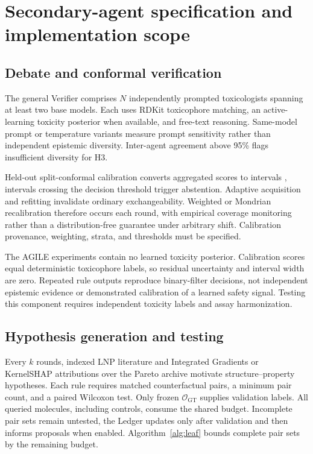 \section{Secondary-agent specification and implementation scope}
\label{app:agents}
\subsection{Debate and conformal verification}
The general Verifier comprises $N$ independently prompted toxicologists spanning at least two base models. Each uses RDKit toxicophore matching, an active-learning toxicity posterior when available, and free-text reasoning. Same-model prompt or temperature variants measure prompt sensitivity rather than independent epistemic diversity. Inter-agent agreement above 95\% flags insufficient diversity for H3.

Held-out split-conformal calibration converts aggregated scores to intervals \citep{angelopoulos2023}, intervals crossing the decision threshold trigger abstention. Adaptive acquisition and refitting invalidate ordinary exchangeability. Weighted or Mondrian recalibration therefore occurs each round, with empirical coverage monitoring rather than a distribution-free guarantee under arbitrary shift. Calibration provenance, weighting, strata, and thresholds must be specified.

The AGILE experiments contain no learned toxicity posterior. Calibration scores equal deterministic toxicophore labels, so residual uncertainty and interval width are zero. Repeated rule outputs reproduce binary-filter decisions, not independent epistemic evidence or demonstrated calibration of a learned safety signal. Testing this component requires independent toxicity labels and assay harmonization.

\subsection{Hypothesis generation and testing}
Every $k$ rounds, indexed LNP literature and Integrated Gradients or KernelSHAP attributions over the Pareto archive motivate structure--property hypotheses. Each rule requires matched counterfactual pairs, a minimum pair count, and a paired Wilcoxon test. Only frozen $\mathcal O_{\mathrm{GT}}$ supplies validation labels. All queried molecules, including controls, consume the shared budget. Incomplete pair sets remain untested, the Ledger updates only after validation and then informs proposals when enabled. Algorithm~\ref{alg:leaf} bounds complete pair sets by the remaining budget.

